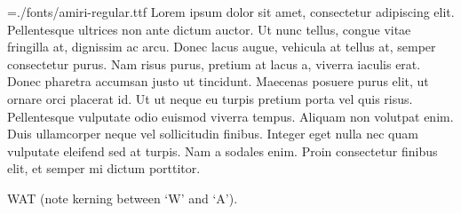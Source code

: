 \nopagenumbers
\parindent=0mm
\font\amiri={./fonts/amiri-regular.ttf}
\amiri
Lorem ipsum dolor sit amet, consectetur adipiscing elit. Pellentesque ultrices non ante dictum auctor. Ut nunc tellus, congue vitae fringilla at, dignissim ac arcu. Donec lacus augue, vehicula at tellus at, semper consectetur purus. Nam risus purus, pretium at lacus a, viverra iaculis erat. Donec pharetra accumsan justo ut tincidunt. Maecenas posuere purus elit, ut ornare orci placerat id. Ut ut neque eu turpis pretium porta vel quis risus. Pellentesque vulputate odio euismod viverra tempus. Aliquam non volutpat enim. Duis ullamcorper neque vel sollicitudin finibus. Integer eget nulla nec quam vulputate eleifend sed at turpis. Nam a sodales enim. Proin consectetur finibus elit, et semper mi dictum porttitor.

WAT (note kerning between ‘W’ and ‘A’).
\bye
